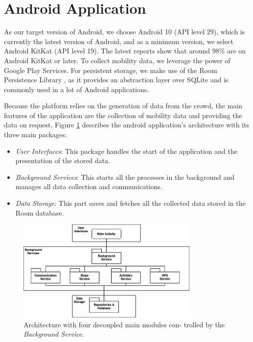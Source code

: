 \section{Android Application}
As our target version of Android, we choose Android 10 (API level 29), which is currently the latest version of Android, and as a minimum version, we select Android KitKat (API level 19). The latest reports \cite{android3}\cite{android4} show that around 98\% are on Android KitKat or later. To collect mobility data, we leverage the power of Google Play Services. For persistent storage, we make use of the Room Persistence Library \cite{room}, as it provides an abstraction layer over SQLite and is commonly used in a lot of Android applications.

Because the platform relies on the generation of data from the crowd, the main features of the application are the collection of mobility data and providing the data on request. Figure \ref{fig:modules} describes the android application's architecture with its three main packages:

\begin{itemize}
    \item \textit{User Interfaces}: This package handles the start of the application and the presentation of the stored data.
    \item \textit{Background Services}: This starts all the processes in the background and manages all data collection and communications.
    \item \textit{Data Storage}: This part saves and fetches all the collected data stored in the Room database.
\end{itemize}

\begin{figure}[htpb]
  \centering
  \includegraphics[width=0.8\textwidth]{figures/modules}
  \caption{Architecture with four decoupled main modules con- trolled by the \textit{Background Service}.} \label{fig:modules}
\end{figure}

